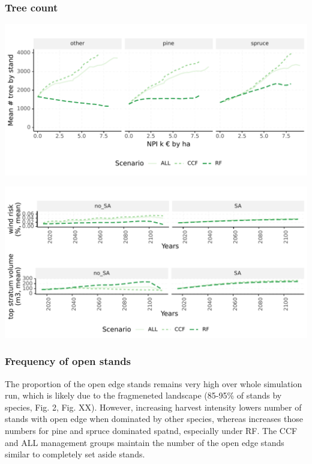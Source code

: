 \documentclass[]{elsarticle} %
\makeatletter
\def\maxwidth{\ifdim\Gin@nat@width>\linewidth\linewidth
\else\Gin@nat@width\fi}
\let\Oldincludegraphics\includegraphics
\renewcommand{\includegraphics}[1]{\Oldincludegraphics[width=\maxwidth]{#1}}
\makeatother
\begin{document}
\hypertarget{tree-count}{%
\subsubsection{Tree count}\label{tree-count}}

\includegraphics{test_manus_files/figure-latex/mean_tree_n-1.pdf}

\includegraphics{test_manus_files/figure-latex/wind_risk_SA-1.pdf}

\hypertarget{frequency-of-open-stands}{%
\subsubsection{Frequency of open
stands}\label{frequency-of-open-stands}}

The proportion of the open edge stands remains very high over whole
simulation run, which is likely due to the fragmeneted landscape
(85-95\% of stands by species, Fig. 2, Fig. XX). However, increasing
harvest intensity lowers number of stands with open edge when dominated
by other species, whereas increases those numbers for pine and spruce
dominated spatnd, especially under RF. The CCF and ALL management groups
maintain the number of the open edge stands similar to completely set
aside stands.
\end{document}
